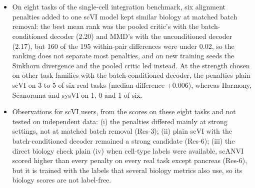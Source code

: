 \documentclass[10pt]{article}
\newcommand{\hd}[2]{\section*{#1 \hfill {\normalfont\small #2}}\vspace{-4pt}}
\begin{document}
\hd{}{\added[id=P3]{about 150 words; 1 paragraph}}
\begin{itemize}
\item On eight tasks of the single-cell integration benchmark, six alignment penalties added to one scVI model kept similar biology at matched batch removal: the best mean rank was the pooled critic's with the batch-conditioned decoder (2.20) and MMD's with the unconditioned decoder (2.17), but 160 of the 195 within-pair differences were under 0.02, so the ranking does not separate most penalties, and on new training seeds the Sinkhorn divergence and the pooled critic led instead. At the strength chosen on other task families with the batch-conditioned decoder, the penalties  plain scVI on 3 to 5 of six real tasks (median difference $+0.006$), whereas Harmony, Scanorama and sysVI  on 1, 0 and 1 of six.
\item Observations for scVI users, from the scores on these eight tasks and not tested on independent data: (i) the penalties differed mainly at strong settings, not at matched batch removal (Res-3); (ii) plain scVI with the batch-conditioned decoder remained a strong candidate (Res-6); (iii) the  direct biology check  plain    (iv) when cell-type labels were available, scANVI scored higher than every penalty on every real task except pancreas (Res-6), but it is trained with the labels that several biology metrics also use, so its biology scores are not label-free.
\end{itemize}

\hd{}{\added[id=P24]{required by BMC}}
\noindent {}\par
\end{document}
